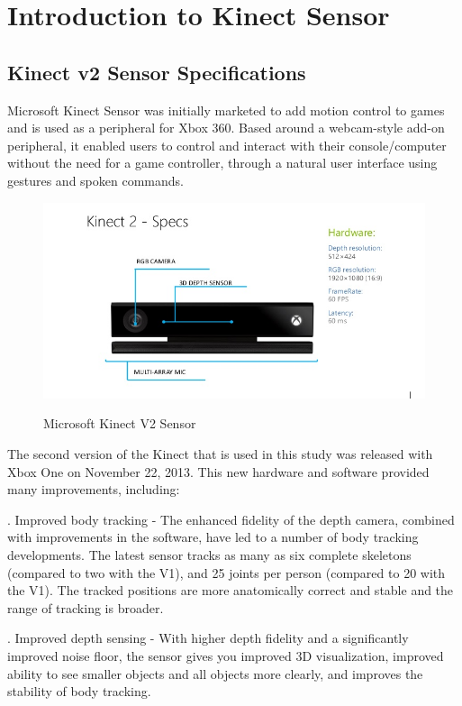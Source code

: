 \chapter{Introduction to Kinect Sensor} \label{Introduction to Kinect Sensor}

\section{Kinect v2 Sensor Specifications} \label{Kinect v2 Sensor Specifications}
\noindent Microsoft Kinect Sensor was initially marketed to add motion control to games and is used as a peripheral for Xbox 360. Based around a webcam-style add-on peripheral, it enabled users to control and interact with their console/computer without the need for a game controller, through a natural user interface using gestures and spoken commands.

\begin{figure}[H]
\centering
{\includegraphics[scale=0.85]{figkinect.png}}
\caption{Microsoft Kinect V2 Sensor}
\end{figure}
\newpage
\noindent The second version of the Kinect that is used in this study was released with Xbox One on   November 22, 2013. This new hardware and software provided many improvements, including:

. Improved body tracking - The enhanced fidelity of the depth camera, combined with improvements in the software, have led to a number of body tracking developments. The latest sensor tracks as many as six complete skeletons (compared to two with the V1), and 25 joints per person (compared to 20 with the V1). The tracked positions are more anatomically correct and stable and the range of tracking is broader.

. Improved depth sensing - With higher depth fidelity and a significantly improved noise floor, the sensor gives you improved 3D visualization, improved ability to see smaller objects and all objects more clearly, and improves the stability of body tracking.

